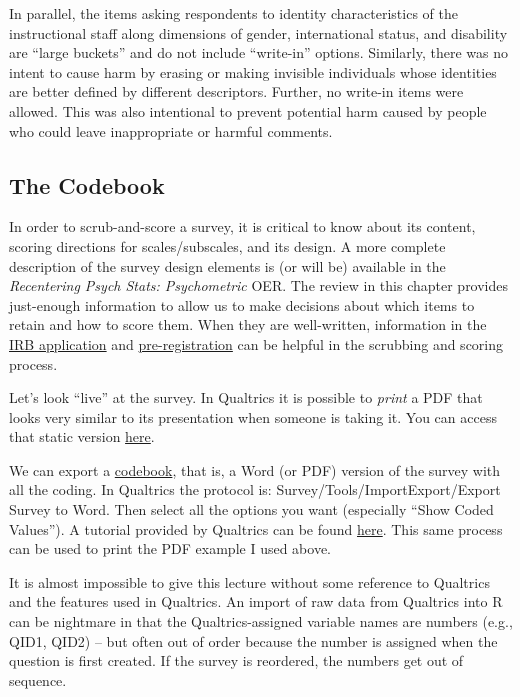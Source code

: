 \documentclass[
  11pt,
]{book}
\begin{document}
In parallel, the items asking respondents to identity characteristics of the instructional staff along dimensions of gender, international status, and disability are ``large buckets'' and do not include ``write-in'' options. Similarly, there was no intent to cause harm by erasing or making invisible individuals whose identities are better defined by different descriptors. Further, no write-in items were allowed. This was also intentional to prevent potential harm caused by people who could leave inappropriate or harmful comments.

\hypertarget{the-codebook}{%
\subsection{The Codebook}\label{the-codebook}}

In order to scrub-and-score a survey, it is critical to know about its content, scoring directions for scales/subscales, and its design. A more complete description of the survey design elements is (or will be) available in the \emph{Recentering Psych Stats: Psychometric} OER. The review in this chapter provides just-enough information to allow us to make decisions about which items to retain and how to score them. When they are well-written, information in the \href{./Bikos_ReCenteringPsychStats_ReCupload.pdf}{IRB application} and \href{https://osf.io/a8e5u}{pre-registration} can be helpful in the scrubbing and scoring process.

Let's look ``live'' at the survey. In Qualtrics it is possible to \emph{print} a PDF that looks very similar to its presentation when someone is taking it. You can access that static version \href{./Rate_a_CoursePDF.pdf}{here}.

We can export a \href{./Rate-a-Course_Codebook.pdf}{codebook}, that is, a Word (or PDF) version of the survey with all the coding. In Qualtrics the protocol is: Survey/Tools/ImportExport/Export Survey to Word. Then select all the options you want (especially ``Show Coded Values''). A tutorial provided by Qualtrics can be found \href{https://www.qualtrics.com/support/survey-platform/survey-module/survey-tools/import-and-export-surveys/}{here}. This same process can be used to print the PDF example I used above.

It is almost impossible to give this lecture without some reference to Qualtrics and the features used in Qualtrics. An import of raw data from Qualtrics into R can be nightmare in that the Qualtrics-assigned variable names are numbers (e.g., QID1, QID2) -- but often out of order because the number is assigned when the question is first created. If the survey is reordered, the numbers get out of sequence.
\end{document}
